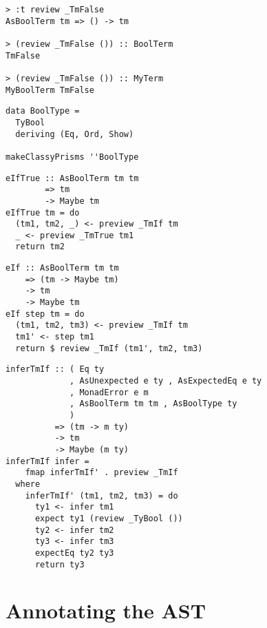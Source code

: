 \documentclass{beamer}
\begin{document}
\begin{frame}[fragile]
  \begin{verbatim}
> :t review _TmFalse
AsBoolTerm tm => () -> tm

> (review _TmFalse ()) :: BoolTerm
TmFalse

> (review _TmFalse ()) :: MyTerm
MyBoolTerm TmFalse
  \end{verbatim}
\end{frame} 

\begin{frame}[fragile]
  \begin{verbatim}
data BoolType =
  TyBool
  deriving (Eq, Ord, Show)

makeClassyPrisms ''BoolType
  \end{verbatim}
\end{frame} 

\begin{frame}[fragile]
  \begin{verbatim}
eIfTrue :: AsBoolTerm tm tm
        => tm
        -> Maybe tm
eIfTrue tm = do
  (tm1, tm2, _) <- preview _TmIf tm
  _ <- preview _TmTrue tm1
  return tm2
  \end{verbatim}
\end{frame} 

\begin{frame}[fragile]
  \begin{verbatim}
eIf :: AsBoolTerm tm tm
    => (tm -> Maybe tm)
    -> tm
    -> Maybe tm
eIf step tm = do
  (tm1, tm2, tm3) <- preview _TmIf tm
  tm1' <- step tm1
  return $ review _TmIf (tm1', tm2, tm3)
  \end{verbatim}
\end{frame} 

\begin{frame}[fragile]
  \begin{verbatim}
inferTmIf :: ( Eq ty
             , AsUnexpected e ty , AsExpectedEq e ty
             , MonadError e m
             , AsBoolTerm tm tm , AsBoolType ty
             )
          => (tm -> m ty)
          -> tm
          -> Maybe (m ty)
inferTmIf infer =
    fmap inferTmIf' . preview _TmIf
  where
    inferTmIf' (tm1, tm2, tm3) = do
      ty1 <- infer tm1
      expect ty1 (review _TyBool ())
      ty2 <- infer tm2
      ty3 <- infer tm3
      expectEq ty2 ty3
      return ty3
  \end{verbatim}
\end{frame} 

\section{Annotating the AST}
\end{document}
